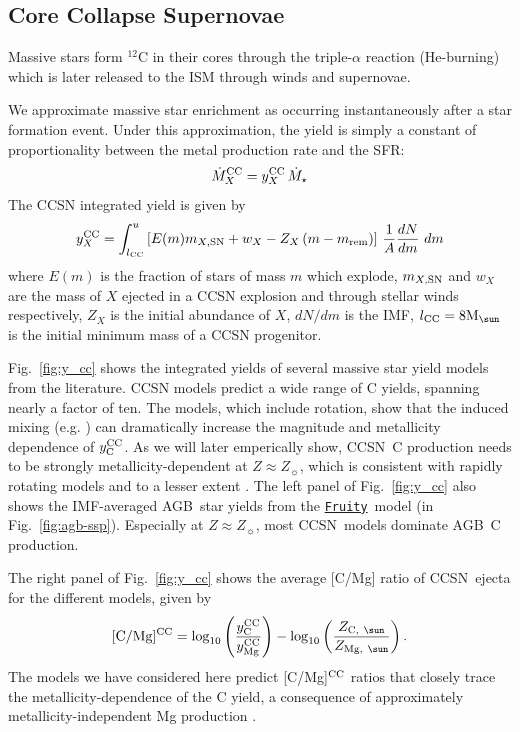 \documentclass[fleqn,
referee, %
usenatbib]{mnras}
\makeatletter
\newcommand{\VICE}{\textsc{vice}}
\newcommand{\fruity}{\texttt{\hyperlink{fruity}{Fruity}}}
\newcommand{\agb}{AGB}
\newcommand{\cc}{CCSN}
\newcommand{\Ycc}{{y_{\rm C}^{\rm CC}}}
\newcommand{\Yoc}{{y_{\rm Mg}^{\rm CC}}}
\newcommand{\Mo}{ {\rm M}_{\sun}}
\newcommand{\Zo}{ Z_{\sun}}
\DeclareRobustCommand\citepos
  {\begingroup
   \let\NAT@nmfmt\NAT@posfmt%
   \NAT@swafalse\let\NAT@ctype\z@\NAT@partrue
   \@ifstar{\NAT@fulltrue\NAT@citetp}{\NAT@fullfalse\NAT@citetp}}
\let\NAT@orig@nmfmt\NAT@nmfmt
\def\NAT@posfmt#1{\NAT@orig@nmfmt{#1's}}
\newcommand{\dbstrike}[1]{{\color{Thistle} \sout{#1} }}
\newcommand{\dbnote}[1]{ {\color{Thistle} \textit{\small (DB: #1)}} }
\makeatother
\begin{document}
\subsection{Core Collapse Supernovae}


Massive stars form $^{12}$C in their cores through the triple-$\alpha$ reaction (He-burning) which is later released to the ISM through winds and supernovae.

We approximate massive star enrichment as occurring instantaneously after a star formation event. Under this approximation, the yield is simply a constant  of proportionality between the metal production rate and the SFR:
\begin{equation}
    \dot{M}_X^{\rm CC} = y_{X}^{\rm CC}\, \dot{M}_\star
\end{equation}
The CCSN integrated yield is given by
\begin{equation}
y_{X}^{\rm CC} = \int_{l_{\rm CC}}^{u} \left[E(m) m_{X\rm, SN} + w_X - Z_X\,(m-m_{\rm rem})\right]\,\frac{1}{A} \frac{dN}{dm}\ dm
\end{equation}
where $E(m)$ is the fraction of stars of mass $m$ which explode, $m_{X,\rm SN}$ and $w_X$ are the mass of $X$ ejected in a CCSN explosion and through stellar winds respectively, $Z_X$ is the initial abundance of $X$, $dN/dm$ is the IMF, $l_{\rm CC}=8\Mo$ is the initial minimum mass of a CCSN progenitor. 

Fig.~\ref{fig:y_cc} shows the integrated yields of several massive star yield models from the literature. 
\cc{} models predict a wide range of C yields, spanning nearly a factor of ten. 
 The \cite{LC18} models, which include rotation, show that the induced mixing (e.g. \citealt{frischknecht+16}) can dramatically increase the magnitude and metallicity dependence of $\Ycc$. As we will later emperically show, \cc\ C production needs to be strongly metallicity-dependent at $Z \approx \Zo$, which is consistent with \citepos{LC18} rapidly rotating models and to a lesser extent \citet{NKT13}.
The left panel of Fig.~\ref{fig:y_cc} also shows the IMF-averaged \agb\ star yields from the \fruity\ model (in Fig.~\ref{fig:agb-ssp}). Especially at $Z\approx \Zo$, most \cc\ models dominate \agb\ C production. 


The right panel of Fig.~\ref{fig:y_cc} shows the average [C/Mg] ratio of \cc\ ejecta for the different models, given by
\begin{equation}\label{eq:c_mg_cc}
    {\rm [C/Mg]^{CC}} = \log_{10}\left( \frac{\Ycc}{\Yoc}\right) - \log_{10} \left( \frac{Z_{{\rm C},\ \sun }}{Z_{{\rm Mg},\ \sun }} \right).
\end{equation}
The models we have considered here predict [C/Mg]$^{\rm CC}$ ratios that closely trace the metallicity-dependence of the C yield, a consequence of approximately
metallicity-independent Mg production \citep[e.g][]{andrews+17}.
\end{document}

